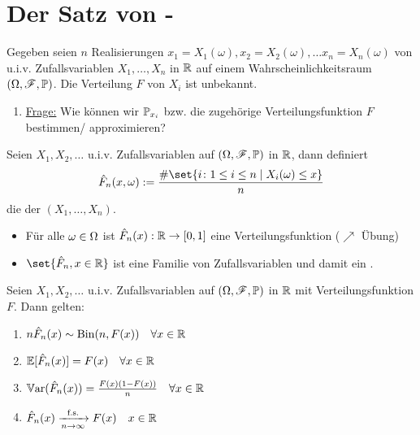 ﻿\section{Der Satz von -}
Gegeben seien $n$ Realisierungen $x_1 = X_1(\omega), x_2 = X_2(\omega), \dots x_n = X_n(\omega)$ von u.i.v. Zufallsvariablen $X_1,\dots, X_n$ in $\R$ auf einem Wahrscheinlichkeitsraum $(\O, \F, \P)$. Die Verteilung $F$ von $X_i$ ist unbekannt.
\begin{enumerate}[label=]
	\item \ul{Frage:} Wie können wir $\P_{x_i}$ bzw. die zugehörige Verteilungsfunktion $F$ bestimmen/ approximieren?
\end{enumerate}
\begin{definition}
	Seien $X_1,X_2, \dots$ u.i.v. Zufallsvariablen auf $(\O,\F,\P)$ in $\R$, dann definiert
	\begin{align*}
		\hat{F}_n(x,\omega) := \frac{\# \set{ i\colon 1 \le i \le n \mid X_i(\omega) \le x}}{n}
	\end{align*}
	die  der  $(X_1, \dots, X_n)$.
\end{definition}
\begin{*remark}
	\begin{itemize}
		\item Für alle $\omega \in \O$ ist $\hat{F}_n(x): \R \to [0,1]$ eine Verteilungsfunktion ($\nearrow$ Übung)
		\item $\set{\hat{F}_n, x \in \R}$ ist eine Familie von Zufallsvariablen und damit ein .
	\end{itemize}
\end{*remark}
\begin{proposition}
	 Seien $X_1, X_2, \dots$ u.i.v. Zufallsvariablen auf $(\O,\F,\P)$ in $\R$ mit Verteilungsfunktion $F$. Dann gelten:
	\begin{enumerate}
		\item $n \hat{F}_n(x) \sim \Bin(n,F(x)) \quad \forall x\in \R$
		\item $\E[\hat{F}_n(x)] = F(x) \quad \forall x \in \R$
		\item $\Var(\hat{F}_n(x)) = \frac{F(x)(1-F(x))}{n} \quad \forall x \in \R$
		\item $\hat{F}_n(x) \xrightarrow[n \to \infty]{\text{f.s.}} F(x) \quad x \in \R$
	\end{enumerate}
\end{proposition}
